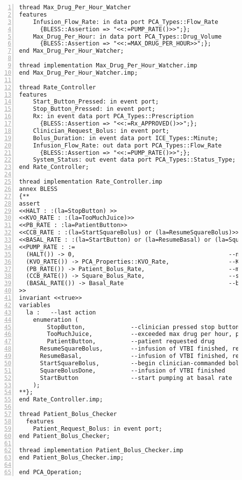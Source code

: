 \begin{lstlisting}[language=aadl, gobble=0, numbers=left, caption={\lstinline{PCA_Operation} package}]
thread Max_Drug_Per_Hour_Watcher
features
    Infusion_Flow_Rate: in data port PCA_Types::Flow_Rate 
      {BLESS::Assertion => "<<:=PUMP_RATE()>>";};    
    Max_Drug_Per_Hour: in data port PCA_Types::Drug_Volume
      {BLESS::Assertion => "<<:=MAX_DRUG_PER_HOUR>>";};  
end Max_Drug_Per_Hour_Watcher;

thread implementation Max_Drug_Per_Hour_Watcher.imp
end Max_Drug_Per_Hour_Watcher.imp;

thread Rate_Controller
features
	Start_Button_Pressed: in event port;
	Stop_Button_Pressed: in event port;
	Rx: in event data port PCA_Types::Prescription
	  {BLESS::Assertion => "<<:=Rx_APPROVED()>>";}; 
    Clinician_Request_Bolus: in event port;   
    Bolus_Duration: in event data port ICE_Types::Minute;  
    Infusion_Flow_Rate: out data port PCA_Types::Flow_Rate
      {BLESS::Assertion => "<<:=PUMP_RATE()>>";};   
    System_Status: out event data port PCA_Types::Status_Type;
end Rate_Controller;

thread implementation Rate_Controller.imp
annex BLESS
{**
assert
<<HALT : :(la=StopButton) >>  													--pump at 0 if stop button
<<KVO_RATE : :(la=TooMuchJuice)>>  												--pump at KVO rate when commanded, some alarms, or excedded hourly limit
<<PB_RATE : :la=PatientButton>>  												--patient button pressed, and allowed
<<CCB_RATE : :(la=StartSquareBolus) or (la=ResumeSquareBolus)>>  				--clinician-commanded bolus start or resumption after patient bolus
<<BASAL_RATE : :(la=StartButton) or (la=ResumeBasal) or (la=SquareBolusDone)>>  --regular infusion
<<PUMP_RATE : :=
  (HALT()) -> 0,                                 			--no flow
  (KVO_RATE()) -> PCA_Properties::KVO_Rate,      			--KVO rate
  (PB_RATE()) -> Patient_Bolus_Rate,						--maximum infusion upon patient request
  (CCB_RATE()) -> Square_Bolus_Rate,             			--square bolus rate=VTBI/duration, from data port
  (BASAL_RATE()) -> Basal_Rate                   			--basal rate, from data port
>>
invariant <<true>>
variables
  la :   --last action
    enumeration (	
    	StopButton,				--clinician pressed stop button
    	TooMuchJuice,     		--exceeded max drug per hour, pump at KVO until prescription and patient are re-authenticated
    	PatientButton,			--patient requested drug
      ResumeSquareBolus,		--infusion of VTBI finished, resume clinician-commanded bolus
      ResumeBasal,				--infusion of VTBI finished, resume basal-rate
      StartSquareBolus,			--begin clinician-commanded bolus
      SquareBolusDone,  		--infusion of VTBI finished
      StartButton				--start pumping at basal rate
    );
**};
end Rate_Controller.imp;

thread Patient_Bolus_Checker
  features
    Patient_Request_Bolus: in event port;
end Patient_Bolus_Checker;

thread implementation Patient_Bolus_Checker.imp
end Patient_Bolus_Checker.imp;

end PCA_Operation;
\end{lstlisting} 
\label{listing:aadl:pca_operation}
\doublespacing
